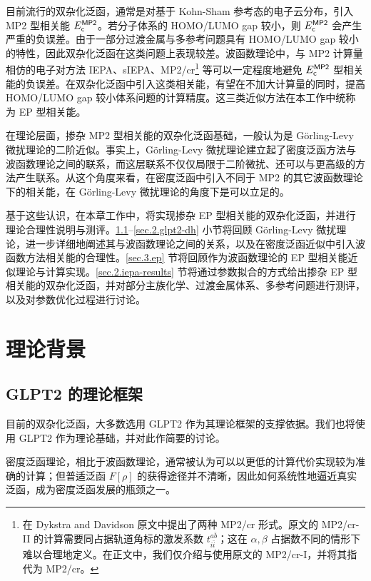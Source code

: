 目前流行的双杂化泛函，通常是对基于 Kohn-Sham 参考态的电子云分布，引入 MP2 型相关能 $E_{\textsf{c}}^{\textsf{MP2}}$。若分子体系的 HOMO/LUMO gap 较小，则 $E_{\textsf{c}}^{\textsf{MP2}}$ 会产生严重的负误差。由于一部分过渡金属与多参考问题具有 HOMO/LUMO gap 较小的特性，因此双杂化泛函在这类问题上表现较差。波函数理论中，与 MP2 计算量相仿的电子对方法 IEPA\cite{Sinanoǧlu-Sinanoǧlu.ACP.1964, Nesbet-Nesbet.ACP.1965}、sIEPA\cite{Zhang-Scheffler.PRL.2016}、MP2/cr\cite{Dykstra-Davidson.IJQC.2000}\footnote{在 Dykstra and Davidson 原文\cite{Dykstra-Davidson.IJQC.2000}中提出了两种 MP2/cr 形式。原文的 MP2/cr-II 的计算需要同占据轨道角标的激发系数 $t_{i \bar i}^{a \bar b}$；这在 $\alpha, \beta$ 占据数不同的情形下难以合理地定义。在正文中，我们仅介绍与使用原文的 MP2/cr-I，并将其指代为 MP2/cr。} 等可以一定程度地避免 $E_{\textsf{c}}^{\textsf{MP2}}$ 型相关能的负误差。在双杂化泛函中引入这类相关能，有望在不加大计算量的同时，提高 HOMO/LUMO gap 较小体系问题的计算精度。这三类近似方法在本工作中统称为 EP 型相关能。

在理论层面，掺杂 MP2 型相关能的双杂化泛函基础，一般认为是 G\"orling-Levy 微扰理论的二阶近似。事实上，G\"orling-Levy 微扰理论建立起了密度泛函方法与波函数理论之间的联系，而这层联系不仅仅局限于二阶微扰、还可以与更高级的方法产生联系。从这个角度来看，在密度泛函中引入不同于 MP2 的其它波函数理论下的相关能，在 G\"orling-Levy 微扰理论的角度下是可以立足的。

基于这些认识，在本章工作中，将实现掺杂 EP 型相关能的双杂化泛函，并进行理论合理性说明与测评。\ref{sec.2.glpt2-theory}--\ref{sec.2.glpt2-dh} 小节将回顾 G\"orling-Levy 微扰理论，进一步详细地阐述其与波函数理论之间的关系，以及在密度泛函近似中引入波函数方法相关能的合理性。\ref{sec.3.ep} 节将回顾作为波函数理论的 EP 型相关能近似理论与计算实现。\ref{sec.2.iepa-results} 节将通过参数拟合的方式给出掺杂 EP 型相关能的双杂化泛函，并对部分主族化学、过渡金属体系、多参考问题进行测评，以及对参数优化过程进行讨论。

\section{理论背景}

\subsection{GLPT2 的理论框架}
\label{sec.2.glpt2-theory}

目前的双杂化泛函，大多数选用 GLPT2 作为其理论框架的支撑依据。我们也将使用 GLPT2 作为理论基础，并对此作简要的讨论。

密度泛函理论，相比于波函数理论，通常被认为可以以更低的计算代价实现较为准确的计算；但普适泛函 $F[\rho]$ 的获得途径并不清晰，因此如何系统性地逼近真实泛函，成为密度泛函发展的瓶颈之一。

